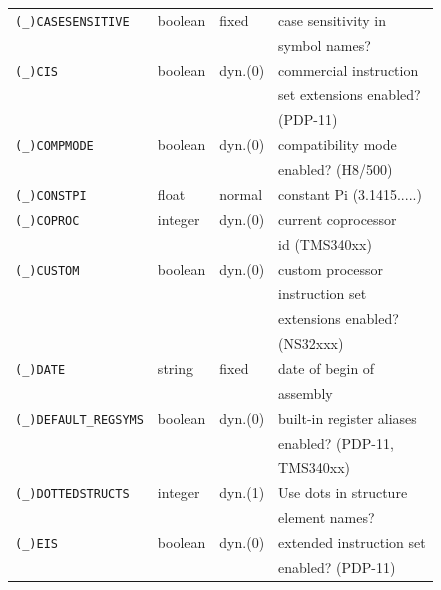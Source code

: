 \documentclass[12pt,twoside]{report}
\newcommand{\predefsym}[1]{{\tt (\_)#1}}
\begin{document}
\begin{center}
\begin{longtable}{|l|l|l|l|}
\hline
\predefsym{CASESENSITIVE} & boolean  & fixed      & case sensitivity in \\
                       &             &            & symbol names? \\
\hline
\predefsym{CIS}        & boolean     & dyn.(0)    & commercial instruction \\
                       &             &            & set extensions enabled? \\
                       &             &            & (PDP-11) \\
\hline
\predefsym{COMPMODE}   & boolean     & dyn.(0)    & compatibility mode \\
                       &             &            & enabled? (H8/500) \\
\hline
\predefsym{CONSTPI}    & float       & normal     & constant Pi (3.1415.....) \\
\hline
\predefsym{COPROC}     & integer     & dyn.(0)    & current coprocessor \\
                       &             &            & id (TMS340xx) \\
\hline
\predefsym{CUSTOM}     & boolean     & dyn.(0)    & custom processor \\
                       &             &            & instruction set \\
                       &             &            & extensions enabled? \\
                       &             &            & (NS32xxx) \\
\hline
\predefsym{DATE}       & string      & fixed      & date of begin of \\
                       &             &            & assembly \\
\hline
\predefsym{DEFAULT\_REGSYMS} & boolean & dyn.(0) & built-in register aliases \\
                       &             &            & enabled? (PDP-11, \\
                       &             &            & TMS340xx) \\
\hline
\predefsym{DOTTEDSTRUCTS} & integer  & dyn.(1)    & Use dots in structure \\
                       &             &            & element names? \\
\hline
\predefsym{EIS}        & boolean     & dyn.(0)    & extended instruction set \\
                       &             &            & enabled? (PDP-11) \\

\end{longtable}
\end{center}
\end{document}

